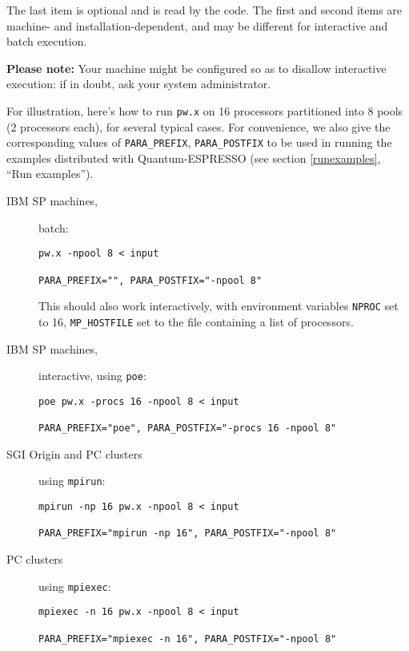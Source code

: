 \documentclass[12pt,a4paper]{article}
\begin{document}
The last item is optional and is read by the code.
The first and second items are machine- and installation-dependent,
and may be different for interactive and batch execution.

\textbf{Please note:}
Your machine might be configured so as to disallow interactive
execution: if in doubt, ask your system administrator.
\bigskip

For illustration, here's how to run \texttt{pw.x} on 16 processors
partitioned into 8 pools (2 processors each), for several typical
cases.
For convenience, we also give the corresponding values of
\texttt{PARA\_PREFIX}, \texttt{PARA\_POSTFIX} to be used in running
the examples distributed with Quantum-ESPRESSO (see section \ref{runexamples},
``Run examples'').

\begin{description}
  \item [IBM SP machines,] batch:
\begin{verbatim}
pw.x -npool 8 < input

PARA_PREFIX="", PARA_POSTFIX="-npool 8"
\end{verbatim}
    This should also work interactively, with environment variables
    \texttt{NPROC} set to 16, \texttt{MP\_HOSTFILE} set to the file
    containing a list of processors.
  \item [IBM SP machines,] interactive, using \texttt{poe}:
\begin{verbatim}
poe pw.x -procs 16 -npool 8 < input

PARA_PREFIX="poe", PARA_POSTFIX="-procs 16 -npool 8"
\end{verbatim}
  \item [SGI Origin and PC clusters] using \texttt{mpirun}:
\begin{verbatim}
mpirun -np 16 pw.x -npool 8 < input

PARA_PREFIX="mpirun -np 16", PARA_POSTFIX="-npool 8"
\end{verbatim}
  \item [PC clusters] using \texttt{mpiexec}:
\begin{verbatim}
mpiexec -n 16 pw.x -npool 8 < input

PARA_PREFIX="mpiexec -n 16", PARA_POSTFIX="-npool 8"
\end{verbatim}

\end{description}
\end{document}
